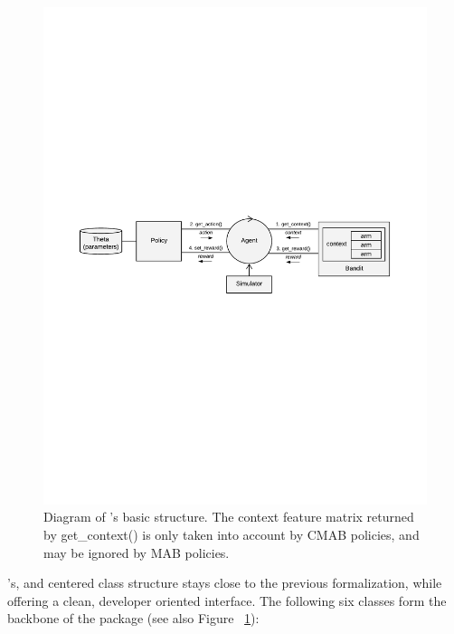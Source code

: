 \documentclass{jss}
\begin{document}
\begin{figure}[H]
  \centering
    \includegraphics[width=.99\textwidth]{fig/CMAB_chart}

      \caption{Diagram of 's basic structure. The context feature matrix returned by get\_context() is only taken into account by CMAB policies, and may be ignored by MAB policies.}
      \label{fig:CMAB_chart}
\end{figure}

's,  and  centered  class structure stays close to the previous formalization, while offering a clean, developer oriented interface. The following six classes form the backbone of the package (see also Figure ~\ref{fig:CMAB_chart}):
\end{document}

